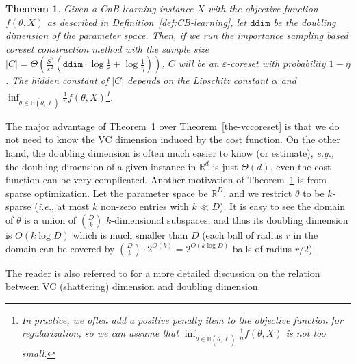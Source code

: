 \documentclass{article}
\newtheorem{theorem}{Theorem}
\newtheorem{remark}[lemma]{Remark}
\begin{document}
\begin{theorem}
    \label{the-coreset-1}
    Given a CnB learning instance $X$ with the objective function $ f(\theta,X) $  as described in Definition~\ref{def:CB-learning},  let $\mathtt{ddim}$ be the doubling dimension of the parameter space. Then, if we run the importance sampling based coreset construction method with the sample size $|C|=\Theta\left(\frac{S^2}{\varepsilon^2}\left(\mathtt{ddim}\cdot\log\frac{1}{\varepsilon}+\log\frac{1}{\eta}\right) \right)$, $ C $ will be an $ \varepsilon $-coreset with probability $ 1-\eta $. The hidden constant of $|C|$ depends on the Lipschitz constant $\alpha$ and $\inf_{\theta\in\mathbb{B}(\tilde{\theta}, \ell)} \frac{1}{n}f(\theta,X)$\footnote{In practice, we often add a positive penalty item to the objective function for regularization, so we can assume that  $\inf_{\theta\in\mathbb{B}(\tilde{\theta}, \ell)} \frac{1}{n}f(\theta,X)$ is not too small.}. 
\end{theorem}
    The major advantage of Theorem~\ref{the-coreset-1} over Theorem~\ref{the-vccoreset} is that we do not need to know the VC dimension induced by the cost function. On the other hand, the doubling dimension is often much easier to know (or estimate), {\em e.g.,} the doubling dimension of a given instance in $\mathbb{R}^d$ is just $\Theta(d)$, even the cost function can be very complicated. Another motivation of  Theorem~\ref{the-coreset-1} is from sparse optimization. Let the parameter space be $\mathbb{R}^D$, and we restrict $\theta$ to be $k$-sparse ({\em i.e.}, at most $k$ non-zero entries with $k\ll D$). It is easy to see the domain of $\theta$ is a union of ${D\choose k}$ $k$-dimensional subspaces, and thus its doubling dimension is $O(k\log D)$ which is much smaller than $D$ (each ball of radius $r$ in the domain can be covered by ${D\choose k}\cdot 2^{O(k)}=2^{O(k\log D)}$ balls of radius $r/2$).
    
    
    The reader is also referred to \cite{HuangJLW18} for a more detailed discussion on the relation between VC (shattering) dimension and doubling dimension.



\end{document}

